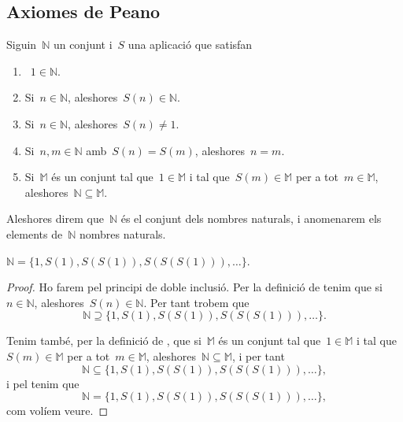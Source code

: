 \documentclass[../../main.tex]{subfiles}
\begin{document}
    \subsection{Axiomes de Peano}
    \begin{definition}
        \label{def:nombres naturals}
        Siguin~\(\mathbb{N}\) un conjunt i~\(S\) una aplicació que satisfan
        \begin{enumerate}
            \item~\(1\in\mathbb{N}\).
            \item Si~\(n\in\mathbb{N}\), aleshores~\(S(n)\in\mathbb{N}\).
            \item Si~\(n\in\mathbb{N}\), aleshores~\(S(n)\neq1\).
            \item Si~\(n,m\in\mathbb{N}\) amb~\(S(n)=S(m)\), aleshores~\(n=m\).
            \item Si~\(\mathbb{M}\) és un conjunt tal que~\(1\in\mathbb{M}\) i tal que~\(S(m)\in\mathbb{M}\) per a tot~\(m\in\mathbb{M}\), aleshores~\(\mathbb{N}\subseteq\mathbb{M}\).
        \end{enumerate}
        Aleshores direm que~\(\mathbb{N}\) és el conjunt dels nombres naturals, i anomenarem els elements de~\(\mathbb{N}\) nombres naturals.
    \end{definition}
    \begin{lemma}
        \label{lema:primer element}
        \(\mathbb{N}=\{1,S(1),S(S(1)),S(S(S(1))),\dots\}\).
        \begin{proof}
            Ho farem pel principi de doble inclusió.
            Per la definició de  tenim que si~\(n\in\mathbb{N}\), aleshores~\(S(n)\in\mathbb{N}\).
            Per tant trobem que
            \[
                \mathbb{N}\supseteq\{1,S(1),S(S(1)),S(S(S(1))),\dots\}.
            \]

            Tenim també, per la definició de , que si~\(\mathbb{M}\) és un conjunt tal que~\(1\in\mathbb{M}\) i tal que~\(S(m)\in\mathbb{M}\) per a tot~\(m\in\mathbb{M}\), aleshores~\(\mathbb{N}\subseteq\mathbb{M}\), i per tant
            \[
                \mathbb{N}\subseteq\{1,S(1),S(S(1)),S(S(S(1))),\dots\},
            \]
            i pel  tenim que
            \[
                \mathbb{N}=\{1,S(1),S(S(1)),S(S(S(1))),\dots\},
            \]
            com volíem veure.
        \end{proof}
    \end{lemma}
\end{document}
